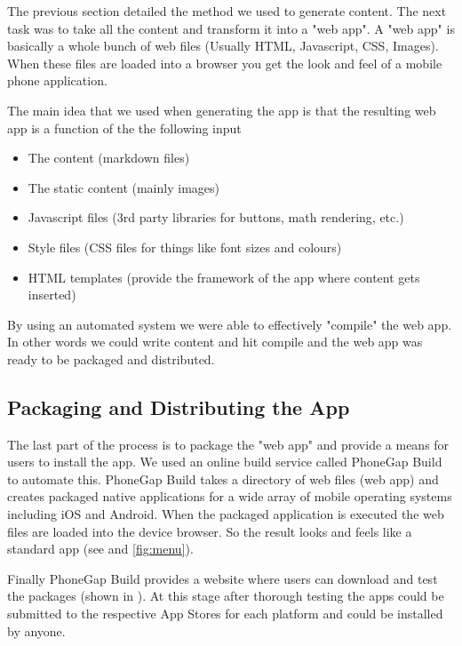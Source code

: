 \documentclass[12pt,a4paper]{article}  %
\begin{document}
The previous section detailed the method we used to generate content. The next task was to take all the content and transform it into a "web app". A "web app" is basically a whole bunch of web files (Usually HTML, Javascript, CSS, Images). When these files are loaded into a browser you get the look and feel of a mobile phone application. 

The main idea that we used when generating the app is that the resulting web app is a function of the the following input
\begin{itemize}
\item The content (markdown files)
\item The static content (mainly images)
\item Javascript files (3rd party libraries for buttons, math rendering, etc.)
\item Style files (CSS files for things like font sizes and colours)
\item HTML templates (provide the framework of the app where content gets inserted)
\end{itemize}

By using an automated system we were able to effectively "compile" the web app. In other words we could write content and hit compile and the web app was ready to be packaged and distributed.

\subsection{Packaging and Distributing the App}

The last part of the process is to package the "web app" and provide a means for users to install the app. We used an online build service called PhoneGap Build \cite{phonegap} to automate this. PhoneGap Build takes a directory of web files (web app) and creates packaged native applications for a wide array of mobile operating systems including iOS and Android. When the packaged application is executed the web files are loaded into the device browser. So the result looks and feels like a standard app (see  and \ref{fig:menu}).

Finally PhoneGap Build provides a website where users can download and test the packages (shown in ). At this stage after thorough testing the apps could be submitted to the respective App Stores for each platform and could be installed by anyone.
\end{document}
